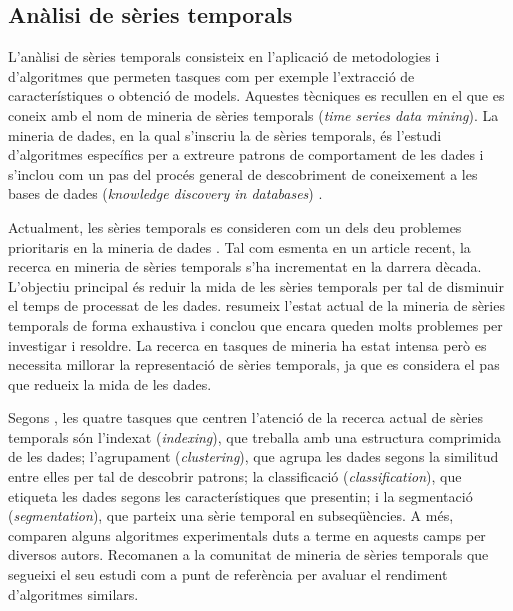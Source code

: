 \subsection{Anàlisi de sèries temporals}

L'anàlisi de sèries temporals consisteix en l'aplicació de
metodologies i d'algoritmes que permeten tasques com per exemple
l'extracció de característiques o obtenció de models.  Aquestes
tècniques es recullen en el que es coneix amb el nom de mineria de
sèries temporals (\emph{time series data mining}). La mineria de
dades, en la qual s'inscriu la de sèries temporals, és l'estudi
d'algoritmes específics per a extreure patrons de comportament de les
dades i s'inclou com un pas del procés general de descobriment de
coneixement a les bases de dades (\emph{knowledge discovery in
  databases}) \parencite{fayyad96,last01}.

Actualment, les sèries temporals es consideren com un dels deu problemes
prioritaris en la mineria de dades \parencite{yangwu06}. Tal com
esmenta \textcite{fu11} en un article recent, la recerca en mineria de
sèries temporals s'ha incrementat en la darrera dècada. L'objectiu
principal és reduir la mida de les sèries temporals per tal de
disminuir el temps de processat de les dades.  \citeauthor{fu11}
resumeix l'estat actual de la mineria de sèries temporals de forma
exhaustiva i conclou que encara queden molts problemes per investigar
i resoldre. La recerca en tasques de mineria ha estat intensa però es
necessita millorar la representació de sèries temporals, ja que es
considera el pas que redueix la mida de les dades.

Segons \textcite{keogh02}, les quatre tasques que centren l'atenció de
la recerca actual de sèries temporals són l'indexat (\emph{indexing}),
que treballa amb una estructura comprimida de les dades; l'agrupament
(\emph{clustering}), que agrupa les dades segons la similitud entre
elles per tal de descobrir patrons; la classificació
(\emph{classification}), que etiqueta les dades segons les
característiques que presentin; i la segmentació
(\emph{segmentation}), que parteix una sèrie temporal en
subseqüències.  A més, \citeauthor{keogh02} comparen alguns algoritmes
experimentals duts a terme en aquests camps per diversos
autors. Recomanen a la comunitat de mineria de sèries temporals que
segueixi el seu estudi com a punt de referència per avaluar el
rendiment d'algoritmes similars.

